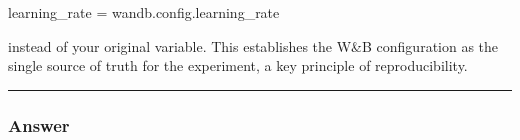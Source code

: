 \documentclass[
  letterpaper,
  DIV=11,
  numbers=noendperiod]{scrartcl}
\newenvironment{Shaded}{\begin{snugshade}}{\end{snugshade}}
\newcommand{\NormalTok}[1]{\textcolor[rgb]{0.00,0.23,0.31}{#1}}
\newcommand{\OperatorTok}[1]{\textcolor[rgb]{0.37,0.37,0.37}{#1}}
\begin{document}
\begin{enumerate}
\begin{Shaded}
\begin{Highlighting}[]
\NormalTok{learning\_rate }\OperatorTok{=}\NormalTok{ wandb.config.learning\_rate}
\end{Highlighting}
\end{Shaded}

  instead of your original variable. This establishes the W\&B
  configuration as the single source of truth for the experiment, a key
  principle of reproducibility.
\end{enumerate}

\begin{center}\rule{0.5\linewidth}{0.5pt}\end{center}

\subsubsection{Answer}\label{answer-1}
\end{document}
